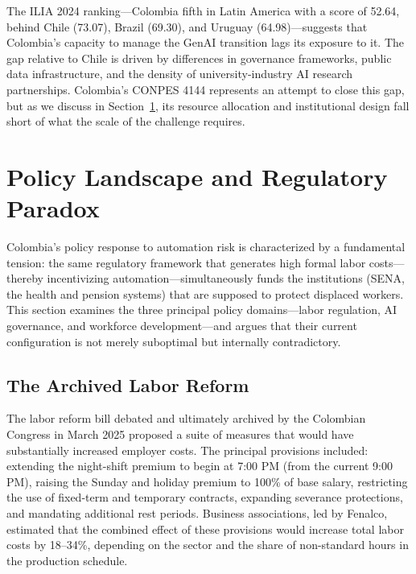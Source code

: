 \documentclass{article}
\begin{document}
The ILIA 2024 \cite{ilia2024} ranking---Colombia fifth in Latin America with a score of 52.64, behind Chile (73.07), Brazil (69.30), and Uruguay (64.98)---suggests that Colombia's capacity to manage the GenAI transition lags its exposure to it. The gap relative to Chile is driven by differences in governance frameworks, public data infrastructure, and the density of university-industry AI research partnerships. Colombia's CONPES 4144 \cite{conpes4144} represents an attempt to close this gap, but as we discuss in Section~\ref{sec:policy}, its resource allocation and institutional design fall short of what the scale of the challenge requires.


\section{Policy Landscape and Regulatory Paradox}
\label{sec:policy}

Colombia's policy response to automation risk is characterized by a fundamental tension: the same regulatory framework that generates high formal labor costs---thereby incentivizing automation---simultaneously funds the institutions (SENA, the health and pension systems) that are supposed to protect displaced workers. This section examines the three principal policy domains---labor regulation, AI governance, and workforce development---and argues that their current configuration is not merely suboptimal but internally contradictory.

\subsection{The Archived Labor Reform}
\label{subsec:labor_reform}

The labor reform bill debated and ultimately archived by the Colombian Congress in March 2025 proposed a suite of measures that would have substantially increased employer costs. The principal provisions included: extending the night-shift premium to begin at 7:00 PM (from the current 9:00 PM), raising the Sunday and holiday premium to 100\% of base salary, restricting the use of fixed-term and temporary contracts, expanding severance protections, and mandating additional rest periods. Business associations, led by Fenalco, estimated that the combined effect of these provisions would increase total labor costs by 18--34\%, depending on the sector and the share of non-standard hours in the production schedule.
\end{document}
